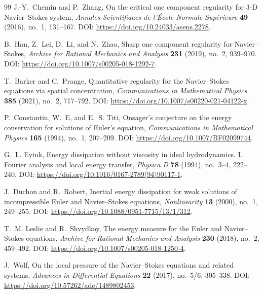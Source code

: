 \documentclass[11pt]{article}
\numberwithin{equation}{section}
\theoremstyle{remark}
\begin{document}
\begin{thebibliography}{99}
J.-Y.~Chemin and P.~Zhang,
\newblock On the critical one component regularity for 3-D Navier--Stokes system,
\newblock \emph{Annales Scientifiques de l'\'Ecole Normale Sup\'erieure} \textbf{49} (2016), no.~1, 131--167.
\newblock DOI: \url{https://doi.org/10.24033/asens.2278}.

B.~Han, Z.~Lei, D.~Li, and N.~Zhao,
\newblock Sharp one component regularity for Navier--Stokes,
\newblock \emph{Archive for Rational Mechanics and Analysis} \textbf{231} (2019), no.~2, 939--970.
\newblock DOI: \url{https://doi.org/10.1007/s00205-018-1292-7}.

T.~Barker and C.~Prange,
\newblock Quantitative regularity for the Navier--Stokes equations via spatial concentration,
\newblock \emph{Communications in Mathematical Physics} \textbf{385} (2021), no.~2, 717--792.
\newblock DOI: \url{https://doi.org/10.1007/s00220-021-04122-x}.

P.~Constantin, W.~E, and E.~S. Titi,
\newblock Onsager's conjecture on the energy conservation for solutions of Euler's equation,
\newblock \emph{Communications in Mathematical Physics} \textbf{165} (1994), no.~1, 207--209.
\newblock DOI: \url{https://doi.org/10.1007/BF02099744}.

G.~L. Eyink,
\newblock Energy dissipation without viscosity in ideal hydrodynamics. I. Fourier analysis and local energy transfer,
\newblock \emph{Physica D} \textbf{78} (1994), no.~3--4, 222--240.
\newblock DOI: \url{https://doi.org/10.1016/0167-2789(94)90117-1}.

J.~Duchon and R.~Robert,
\newblock Inertial energy dissipation for weak solutions of incompressible Euler and Navier--Stokes equations,
\newblock \emph{Nonlinearity} \textbf{13} (2000), no.~1, 249--255.
\newblock DOI: \url{https://doi.org/10.1088/0951-7715/13/1/312}.

T.~M. Leslie and R.~Shvydkoy,
\newblock The energy measure for the Euler and Navier--Stokes equations,
\newblock \emph{Archive for Rational Mechanics and Analysis} \textbf{230} (2018), no.~2, 459--492.
\newblock DOI: \url{https://doi.org/10.1007/s00205-018-1250-4}.

J.~Wolf,
\newblock On the local pressure of the Navier--Stokes equations and related systems,
\newblock \emph{Advances in Differential Equations} \textbf{22} (2017), no.~5/6, 305--338.
\newblock DOI: \url{https://doi.org/10.57262/ade/1489802453}.


\end{thebibliography}
\end{document}
